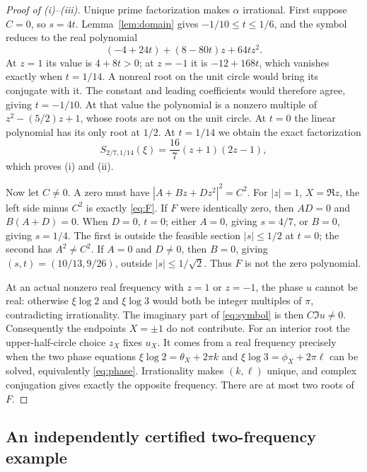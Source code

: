\documentclass[11pt]{article}
\theoremstyle{definition}\newtheorem{definition}[theorem]{Definition}
\theoremstyle{remark}\newtheorem{remark}[theorem]{Remark}
\begin{document}
\begin{proof}[Proof of \textup{(i)--(iii)}]
Unique prime factorization makes $\alpha$ irrational.
First suppose $C=0$, so $s=4t$. Lemma~\ref{lem:domain} gives
$-1/10\le t\le1/6$, and the symbol reduces to the real polynomial
\[
 (-4+24t)+(8-80t)z+64tz^2.
\]
At $z=1$ its value is $4+8t>0$; at $z=-1$ it is $-12+168t$,
which vanishes exactly when $t=1/14$.
A nonreal root on the unit circle would bring its conjugate with it.
The constant and leading coefficients would therefore agree, giving
$t=-1/10$. At that value the polynomial is a nonzero multiple of
$z^2-(5/2)z+1$, whose roots are not on the unit circle. At $t=0$ the
linear polynomial has its only root at $1/2$.
At $t=1/14$ we obtain the exact factorization
\begin{equation}\label{eq:specialfactor}
 S_{2/7,1/14}(\xi)=\frac{16}{7}(z+1)(2z-1),
\end{equation}
which proves (i) and (ii).

Now let $C\ne0$. A zero must have
$|A+Bz+Dz^2|^2=C^2$. For $|z|=1$, $X=\Re z$, the left side minus
$C^2$ is exactly \eqref{eq:F}.
If $F$ were identically zero, then $AD=0$ and $B(A+D)=0$.
When $D=0$, $t=0$; either $A=0$, giving $s=4/7$, or $B=0$, giving
$s=1/4$. The first is outside the feasible section $|s|\le1/2$ at $t=0$;
the second has $A^2\ne C^2$. If $A=0$ and $D\ne0$, then $B=0$,
giving $(s,t)=(10/13,9/26)$, outside $|s|\le1/\sqrt2$.
Thus $F$ is not the zero polynomial.

At an actual nonzero real frequency with $z=1$ or $z=-1$, the phase
$u$ cannot be real: otherwise $\xi\log2$ and $\xi\log3$ would both
be integer multiples of $\pi$, contradicting irrationality.
The imaginary part of \eqref{eq:symbol} is then $C\Im u\ne0$.
Consequently the endpoints $X=\pm1$ do not contribute.
For an interior root the upper-half-circle choice $z_X$ fixes $u_X$.
It comes from a real frequency precisely when the two phase equations
$\xi\log2=\theta_X+2\pi k$ and
$\xi\log3=\phi_X+2\pi\ell$ can be solved, equivalently \eqref{eq:phase}.
Irrationality makes $(k,\ell)$ unique, and complex conjugation gives
exactly the opposite frequency. There are at most two roots of $F$.
\end{proof}

\subsection{An independently certified two-frequency example}
\end{document}
